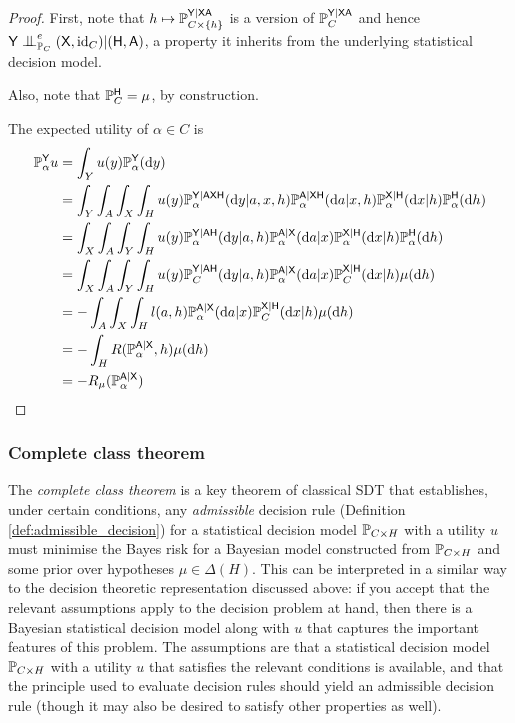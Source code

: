 \begin{proof}
First, note that $h\mapsto \mathbb{P}_{C\times \{h\}}^{\mathsf{Y}|\mathsf{XA}}$ is a version of $\mathbb{P}_C^{\mathsf{Y}|\mathsf{XA}}$ and hence $\RV{Y}\CI^e_{\prob{P}_C} (\RV{X},\text{id}_C)|(\RV{H},\RV{A})$, a property it inherits from the underlying statistical decision model.

Also, note that $\mathbb{P}_C^{\mathsf{H}}=\mu$, by construction.

The expected utility of $\alpha\in C$ is 
\begin{align}
    \mathbb{P}_\alpha^{\mathsf{Y}} u &= \int_Y u(y) \mathbb{P}_{\alpha}^{\mathsf{Y}}(\mathrm{d}y) \\
    &= \int_Y  \int_A \int_{X} \int_H u(y)\mathbb{P}_{\alpha}^{\mathsf{Y}|\mathsf{AXH}}(\mathrm{d}y|a,x,h)\mathbb{P}_{\alpha}^{\mathsf{A}|\mathsf{XH}}(\mathrm{d}a|x,h)\mathbb{P}_{\alpha}^{\mathsf{X}|\mathsf{H}}(\mathrm{d}x|h)\mathbb{P}_\alpha^{\mathsf{H}}(\mathrm{d}h) \\
    &= \int_X  \int_A \int_{Y} \int_H u(y) \mathbb{P}_{\alpha}^{\mathsf{Y}|\mathsf{AH}}(\mathrm{d}y|a,h)\mathbb{P}_{\alpha}^{\mathsf{A}|\mathsf{X}}(\mathrm{d}a|x)\mathbb{P}_{\alpha}^{\mathsf{X}|\mathsf{H}}(\mathrm{d}x|h)\mathbb{P}_\alpha^{\mathsf{H}}(\mathrm{d}h)\\
    &=  \int_X  \int_A \int_{Y} \int_H u(y) \mathbb{P}_{C}^{\mathsf{Y}|\mathsf{AH}}(\mathrm{d}y|a,h)\mathbb{P}_{\alpha}^{\mathsf{A}|\mathsf{X}}(\mathrm{d}a|x)\mathbb{P}_{C}^{\mathsf{X}|\mathsf{H}}(\mathrm{d}x|h)\mu(\mathrm{d}h)\\
     &= -\int_A\int_X\int_H l(a,h)\mathbb{P}_{\alpha}^{\mathsf{A}|\mathsf{X}}(\mathrm{d}a|x)\mathbb{P}_{C}^{\mathsf{X}|\mathsf{H}}(\mathrm{d}x|h)\mu(\mathrm{d}h)\\
    &= -\int_H R(\mathbb{P}_{\alpha}^{\mathsf{A}|\mathsf{X}},h)\mu(\mathrm{d}h)\\
    &= -R_{\mu}(\mathbb{P}_{\alpha}^{\mathsf{A}|\mathsf{X}})
\end{align}
\end{proof}

\subsubsection{Complete class theorem}\label{sec:cc_theorem}

The \emph{complete class theorem} is a key theorem of classical SDT that establishes, under certain conditions, any \emph{admissible} decision rule (Definition \ref{def:admissible_decision}) for a statistical decision model $\mathbb{P}_{C\times H}$ with a utility $u$ must minimise the Bayes risk for a Bayesian model constructed from $\mathbb{P}_{C\times H}$ and some prior over hypotheses $\mu\in \Delta(H)$. This can be interpreted in a similar way to the decision theoretic representation discussed above: if you accept that the relevant assumptions apply to the decision problem at hand, then there is a Bayesian statistical decision model along with $u$ that captures the important features of this problem. The assumptions are that a statistical decision model $\mathbb{P}_{C\times H}$ with a utility $u$ that satisfies the relevant conditions is available, and that the principle used to evaluate decision rules should yield an admissible decision rule (though it may also be desired to satisfy other properties as well).


